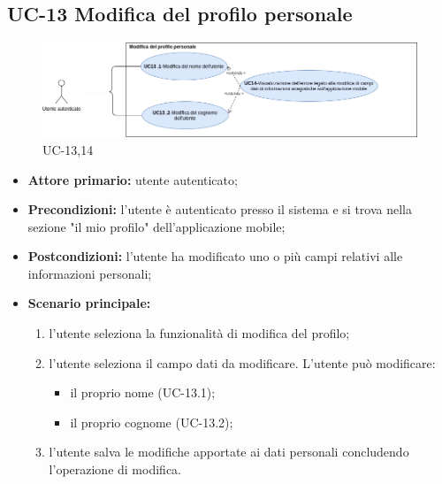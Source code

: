 \subsection{UC-13 Modifica del profilo personale} 

\begin{figure}[H]
	\centering
	\includegraphics[width=\textwidth]{src/CasiDUso/immagini/SottocasiModificaProfilo.png}
	\caption{UC-13,14}
\end{figure}

\begin{itemize}

	\item \textbf{Attore primario:} utente autenticato;

	\item \textbf{Precondizioni:} l'utente è autenticato presso il sistema e si trova nella sezione "il mio profilo" dell'applicazione mobile;

	\item \textbf{Postcondizioni:} l'utente ha modificato uno o più campi relativi alle informazioni personali;

	\item \textbf{Scenario principale:} 
	
		\begin{enumerate}
    		\item  l'utente seleziona la funzionalità di modifica del profilo;
    		\item  l'utente seleziona il campo dati da modificare. L'utente può modificare:
    		
    			\begin{itemize}
        			\item il proprio nome (UC-13.1); 
        			\item il proprio cognome (UC-13.2); 
    			\end{itemize} 
    			
    		\item l'utente salva le modifiche apportate ai dati personali concludendo l'operazione di modifica.
    		
		\end{enumerate}
		
\end{itemize}


